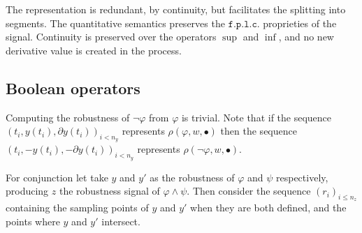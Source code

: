\documentclass{suftesi}
\begin{document}
The representation is redundant, by continuity, but facilitates the splitting into segments. The quantitative semantics preserves the $\mathtt{f.p.l.c.}$ proprieties of the signal. Continuity is preserved over the operators $\sup$ and $\inf$, and no new derivative value is created in the process.

\subsection{Boolean operators}

Computing the robustness of $\lnot \varphi$ from $\varphi$ is trivial. Note that if the sequence $(t_i,y(t_i),\partial y(t_i))_{i<n_y}$ represents $\rho(\varphi,w,\bullet)$ then the sequence $(t_i,-y(t_i),-\partial y(t_i))_{i<n_y}$ represents $\rho(\lnot\varphi,w,\bullet)$.

For conjunction let take $y$ and $y'$ as the robustness of $\varphi$ and $\psi$ respectively, producing $z$ the robustness signal of $\varphi\land\psi$. Then consider the sequence $(r_i)_{i\leq n_z}$ containing the sampling points of $y$ and $y'$ when they are both defined, and the points where $y$ and $y'$ intersect.

\printbibliography
\end{document}
